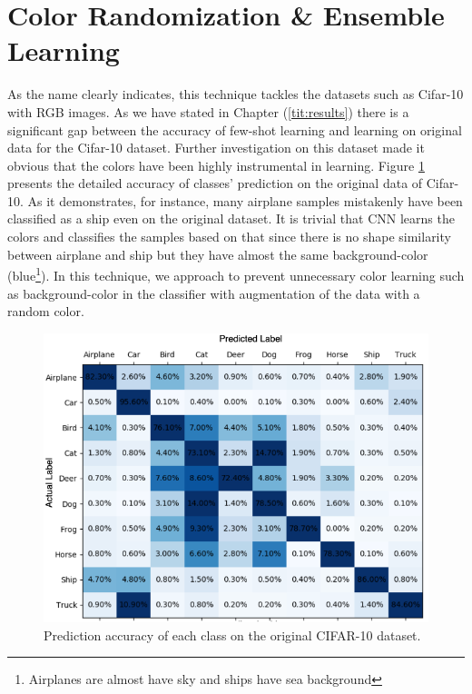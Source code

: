 \section{Color Randomization \& Ensemble Learning}
As the name clearly indicates, this technique tackles the datasets such as Cifar-10 with RGB images.
As we have stated in Chapter (\ref{tit:results}) there is a significant gap between the accuracy of few-shot
learning and learning on original data for the Cifar-10 dataset. Further investigation on this
dataset made it obvious that the colors have been highly instrumental in learning. Figure \ref{fig:original_cifar_10}
presents the detailed accuracy of classes' prediction on the original data of Cifar-10. As it
demonstrates, for instance, many airplane samples mistakenly have been classified as a ship even on
the original dataset. It is trivial that CNN learns the colors and classifies the samples based on
that since there is no shape similarity between airplane and ship but they have almost the same
background-color (blue\footnote{Airplanes are almost have sky and ships have sea background}). In this technique, we approach to prevent unnecessary color learning such as background-color in the classifier with augmentation of the data with a random color.

\begin{figure}
  \centering
  \label{fig:original_cifar_10}
  \includegraphics[width=1\textwidth]{fig/contribution/original_cifar_10}
  \caption{Prediction accuracy of each class on the original CIFAR-10 dataset.}
\end{figure}

